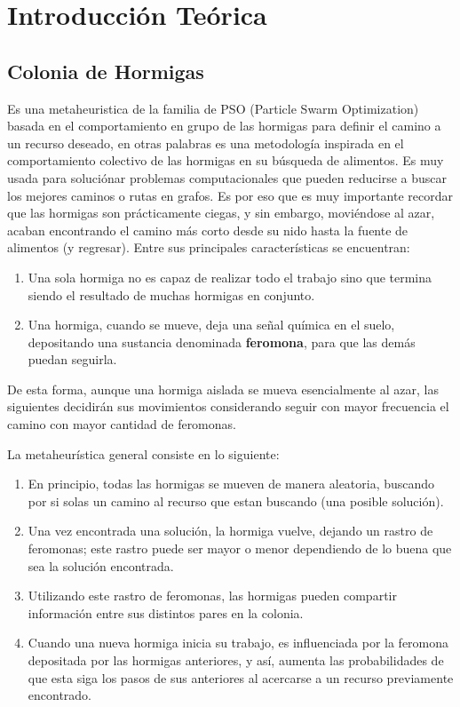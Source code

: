 \newpage
\section{Introducción Teórica}\label{sec:introduccion}
\subsection{Colonia de Hormigas}
Es una metaheuristica de la familia de PSO (Particle Swarm Optimization) basada en el comportamiento en grupo de las hormigas para definir el camino a un recurso deseado, en otras palabras es una metodología inspirada en el comportamiento colectivo de las hormigas en su búsqueda de alimentos. 
Es muy usada para soluci\'onar problemas computacionales que pueden reducirse a buscar los mejores caminos o rutas en grafos. Es por eso que es muy importante recordar que las hormigas son prácticamente ciegas, y sin embargo, moviéndose al azar, acaban encontrando el camino más corto desde su nido hasta la fuente de alimentos (y regresar).
Entre sus principales características se encuentran:

\begin{enumerate}
\item Una sola hormiga no es capaz de realizar todo el trabajo sino que termina siendo el resultado de muchas hormigas en conjunto.
\item Una hormiga, cuando se mueve, deja una señal química en el suelo, depositando una sustancia denominada \textbf{feromona}, para que las demás puedan seguirla.
\end{enumerate}

De esta forma, aunque una hormiga aislada se mueva esencialmente al azar, las siguientes decidirán sus movimientos considerando seguir con mayor frecuencia el camino con mayor cantidad de feromonas.

La metaheurística general consiste en lo siguiente:
\begin{enumerate}
\item En principio, todas las hormigas se mueven de manera aleatoria, buscando por si solas un camino al recurso que estan buscando (una posible solución).
\item Una vez encontrada una soluci\'on, la hormiga vuelve, dejando un rastro de feromonas; este rastro puede ser mayor o menor dependiendo de lo buena que sea la solución encontrada. 
\item Utilizando este rastro de feromonas, las hormigas pueden compartir información entre sus distintos pares en la colonia.
\item Cuando una nueva hormiga inicia su trabajo, es influenciada por la feromona depositada por las hormigas anteriores, y así, aumenta las probabilidades de que esta siga los pasos de sus anteriores
al acercarse a un recurso previamente encontrado.
\end{enumerate}


